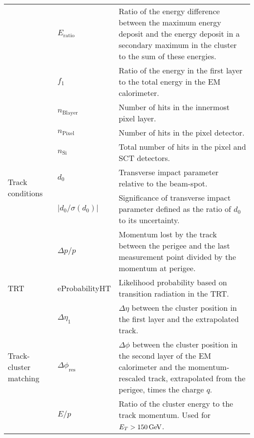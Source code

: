 \begin{table}[!htb]
\begin{scriptsize}
\begin{center}
\begin{tabularx}{\textwidth}{|X|l|X|}
            & $E_{\text{ratio}}$ & Ratio of the energy difference between the maximum energy deposit and the energy deposit
            in a secondary maximum in the cluster to the sum of these energies. \\ \cline{2-3}
            & $f_1$ & Ratio of the energy in the first layer to the total energy in the EM calorimeter.\\
    \hline
    \multirow{6}{*}{Track conditions} & $n_{\text{Blayer}}$ & Number of hits in the innermost pixel layer. \\ \cline{2-3}
            & $n_{\text{Pixel}}$ & Number of hits in the pixel detector. \\ \cline{2-3}
            & $n_{\text{Si}}$ & Total number of hits in the pixel and SCT detectors.\\ \cline{2-3}
            & $d_0$ & Transverse impact parameter relative to the beam-spot. \\ \cline{2-3}
            & $\lvert d_0 / \sigma(d_0) \rvert$ & Significance of transverse impact parameter defined as
            the ratio of $d_0$ to its uncertainty. \\ \cline{2-3}
            & $\Delta p / p$ &  Momentum lost by the track between the perigee and the last measurement point
            divided by the momentum at perigee. \\
    \hline
    \multirow{1}{*}{TRT} & eProbabilityHT & Likelihood probability based on transition radiation in the TRT. \\
    \hline
    \multirow{3}{*}{Track-cluster matching} & $\Delta \eta_1$  & $\Delta \eta$ between the cluster position in the first layer
            and the extrapolated track. \\ \cline{2-3}
            & $\Delta \phi_{\text{res}}$ & $\Delta \phi$ between the cluster position in the second layer of the EM calorimeter
            and the momentum-rescaled track, extrapolated from the perigee, times the charge $q$. \\ \cline{2-3}
            & $E/p$ & Ratio of the cluster energy to the track momentum. Used for $E_T>150\,\text{Ge\kern -0.1em V}$.\\
    \hline
    \hline
    \end{tabularx}
    \end{center}
    \end{scriptsize}
\end{table}
